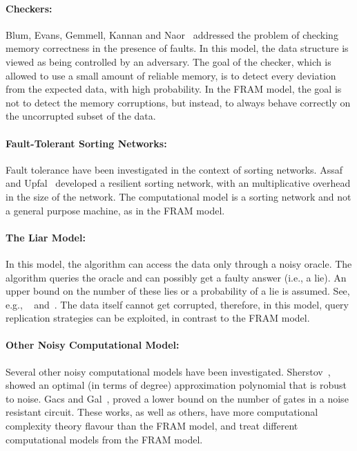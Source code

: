 \documentclass{llncs}
\begin{document}
\paragraph{Checkers:}

		Blum, Evans, Gemmell, Kannan and Naor~\cite{checkers} 
		addressed the problem of checking memory correctness in the presence of faults.
		In this model, the data structure is viewed as being controlled by an adversary.
		The goal of the checker,
		which is allowed to use a small amount of reliable memory,
		is to detect every deviation from the expected data, 
		with high probability. In the FRAM model, the goal is not to detect the 
		memory corruptions, but instead, to always behave correctly on the uncorrupted subset of the data.

\paragraph{Fault-Tolerant Sorting Networks:}
		
		Fault tolerance have been investigated in the context of sorting networks.
		Assaf and Upfal~\cite{fault_tolerant_sorting_networks} developed a resilient sorting network,
		with an  multiplicative overhead in the size of the network.
		The computational model is a sorting network and not a general purpose machine, as in the FRAM model.
				 
\paragraph{The Liar Model:} 

		In this model, the algorithm can access the data only through a noisy oracle.
		The algorithm queries the oracle and can possibly get a faulty answer (i.e., a lie).
		An upper bound on the number of these lies or a probability of a lie is assumed.
		See, e.g., ~\cite{liar_1} and~\cite{liar_2}.
		The data itself cannot get corrupted, therefore, 
		in this model, query replication strategies can be exploited,
		in contrast to the FRAM model.

\paragraph{Other Noisy Computational Model:}
		
		Several other noisy computational models have been investigated.
		Sherstov~\cite{robust_polynomials}, showed an optimal (in terms of degree) approximation polynomial
		that is robust to noise. Gacs and Gal~\cite{robust_circuits}, proved a lower bound on the number of gates
		in a noise resistant circuit.
		These works, as well as others, have more computational complexity theory flavour than the FRAM model,
		and treat different computational models from the FRAM model.
\end{document}

